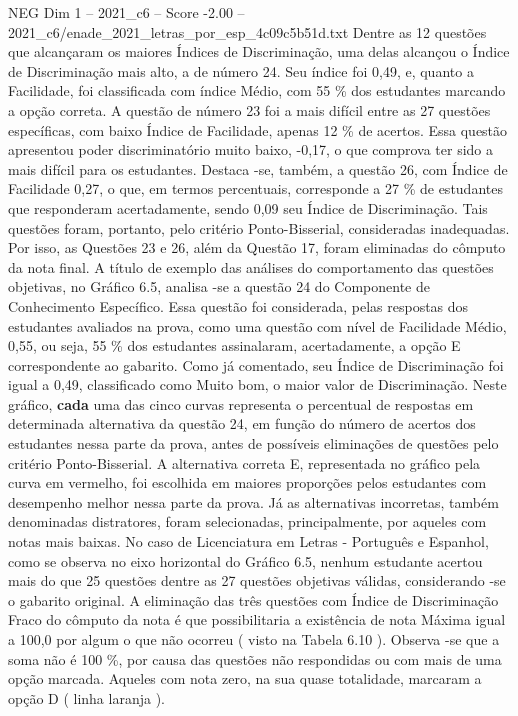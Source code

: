 \begin{textsample}{NEG Dim 1 – 2021\_c6 – Score -2.00 – 2021\_c6/enade\_2021\_letras\_por\_esp\_4c09c5b51d.txt}
Dentre as 12 questões que alcançaram os maiores Índices de Discriminação, uma delas alcançou o Índice de Discriminação mais alto, a de número 24.
Seu índice foi 0,49, e, quanto a Facilidade, foi classificada com índice Médio, com 55 \% dos estudantes marcando a opção correta.
A questão de número 23 foi a mais difícil entre as 27 questões específicas, com baixo Índice de Facilidade, apenas 12 \% de acertos.
Essa questão apresentou poder discriminatório muito baixo, -0,17, o que comprova ter sido a mais difícil para os estudantes.
Destaca -se, também, a questão 26, com Índice de Facilidade 0,27, o que, em termos percentuais, corresponde a 27 \% de estudantes que responderam acertadamente, sendo 0,09 seu Índice de Discriminação.
Tais questões foram, portanto, pelo critério Ponto-Bisserial, consideradas inadequadas.
Por isso, as Questões 23 e 26, além da Questão 17, foram eliminadas do cômputo da nota final.
A título de exemplo das análises do comportamento das questões objetivas, no Gráfico 6.5, analisa -se a questão 24 do Componente de Conhecimento Específico.
Essa questão foi considerada, pelas respostas dos estudantes avaliados na prova, como uma questão com nível de Facilidade Médio, 0,55, ou seja, 55 \% dos estudantes assinalaram, acertadamente, a opção E correspondente ao gabarito.
Como já comentado, seu Índice de Discriminação foi igual a 0,49, classificado como Muito bom, o maior valor de Discriminação.
Neste gráfico, \textbf{cada} uma das cinco curvas representa o percentual de respostas em determinada alternativa da questão 24, em função do número de acertos dos estudantes nessa parte da prova, antes de possíveis eliminações de questões pelo critério Ponto-Bisserial.
A alternativa correta E, representada no gráfico pela curva em vermelho, foi escolhida em maiores proporções pelos estudantes com desempenho melhor nessa parte da prova.
Já as alternativas incorretas, também denominadas distratores, foram selecionadas, principalmente, por aqueles com notas mais baixas.
No caso de Licenciatura em Letras - Português e Espanhol, como se observa no eixo horizontal do Gráfico 6.5, nenhum estudante acertou mais do que 25 questões dentre as 27 questões objetivas válidas, considerando -se o gabarito original.
A eliminação das três questões com Índice de Discriminação Fraco do cômputo da nota é que possibilitaria a existência de nota Máxima igual a 100,0 por algum o que não ocorreu ( visto na Tabela 6.10 ).
Observa -se que a soma não é 100 \%, por causa das questões não respondidas ou com mais de uma opção marcada.
Aqueles com nota zero, na sua quase totalidade, marcaram a opção D ( linha laranja ).

\end{textsample}
